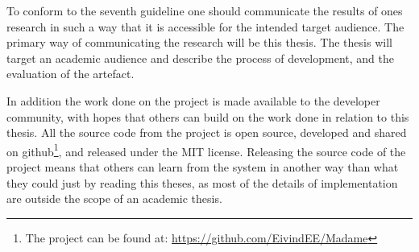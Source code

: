 To conform to the seventh guideline one should communicate the results of ones research in such a way that it is accessible for the intended target audience.
The primary way of communicating the research will be this thesis.
The thesis will target an academic audience and describe the process of development,
and the evaluation of the artefact.

In addition the work done on the project is made available to the developer community,
with hopes that others can build on the work done in relation to this thesis.
All the source code from the project is open source,
developed and shared on github\footnote{The project can be found at: \url{https://github.com/EivindEE/Madame}},
and released under the MIT license.
Releasing the source code of the project means that others can learn from the system in another way than what they
could just by reading this theses, as most of the details of implementation are outside the scope of an academic thesis.



